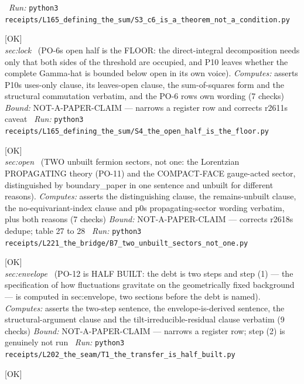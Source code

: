 \begin{description}
\ \emph{Run:} \texttt{python3 receipts/L165\_defining\_the\_sum/S3\_c6\_is\_a\_theorem\_not\_a\_condition.py}
\item[\label{rcpt:S4_the_open_half_is_the_floor}\texttt{S4\_the\_open\_half\_is\_the\_floor}]\hfill\textsf{[OK]}\\
\textit{sec:lock} \ (PO-6s open half is the FLOOR: the direct-integral decomposition needs only that both sides of the threshold are occupied, and P10 leaves whether the complete Gamma-hat is bounded below open in its own voice). 
\emph{Computes:} asserts P10s uses-only clause, its leaves-open clause, the sum-of-squares form and the structural commutation verbatim, and the PO-6 rows own wording (7 checks)
 \emph{Bound:} NOT-A-PAPER-CLAIM --- narrows a register row and corrects r2611s caveat
\ \emph{Run:} \texttt{python3 receipts/L165\_defining\_the\_sum/S4\_the\_open\_half\_is\_the\_floor.py}
\item[\label{rcpt:B7_two_unbuilt_sectors_not_one}\texttt{B7\_two\_unbuilt\_sectors\_not\_one}]\hfill\textsf{[OK]}\\
\textit{sec:open} \ (TWO unbuilt fermion sectors, not one: the Lorentzian PROPAGATING theory (PO-11) and the COMPACT-FACE gauge-acted sector, distinguished by boundary\_paper in one sentence and unbuilt for different reasons). 
\emph{Computes:} asserts the distinguishing clause, the remains-unbuilt clause, the no-equivariant-index clause and p0s propagating-sector wording verbatim, plus both reasons (7 checks)
 \emph{Bound:} NOT-A-PAPER-CLAIM --- corrects r2618s dedupe; table 27 to 28
\ \emph{Run:} \texttt{python3 receipts/L221\_the\_bridge/B7\_two\_unbuilt\_sectors\_not\_one.py}
\item[\label{rcpt:T1_the_transfer_is_half_built}\texttt{T1\_the\_transfer\_is\_half\_built}]\hfill\textsf{[OK]}\\
\textit{sec:envelope} \ (PO-12 is HALF BUILT: the debt is two steps and step (1) --- the specification of how fluctuations gravitate on the geometrically fixed background --- is computed in sec:envelope, two sections before the debt is named). 
\emph{Computes:} asserts the two-step sentence, the envelope-is-derived sentence, the structural-argument clause and the tilt-irreducible-residual clause verbatim (9 checks)
 \emph{Bound:} NOT-A-PAPER-CLAIM --- narrows a register row; step (2) is genuinely not run
\ \emph{Run:} \texttt{python3 receipts/L202\_the\_seam/T1\_the\_transfer\_is\_half\_built.py}
\item[\label{rcpt:C12_the_odd_even_half_has_its_parameter}\texttt{C12\_the\_odd\_even\_half\_has\_its\_parameter}]\hfill\textsf{[OK]}\\

\end{description}
